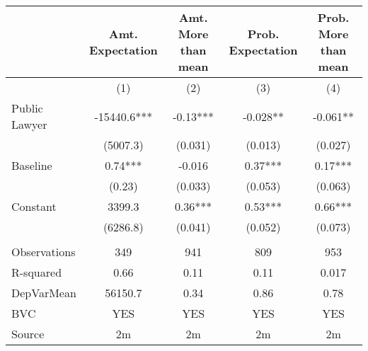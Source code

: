 \begin{tabular}{lcccc}
\toprule
      & Amt. Expectation & Amt. More than mean & Prob. Expectation & Prob. More than mean \\
\midrule
\midrule
      & (1)   & (2)   & (3)   & (4) \\
\midrule
\midrule
Public Lawyer & -15440.6*** & -0.13*** & -0.028** & -0.061** \\
      & (5007.3) & (0.031) & (0.013) & (0.027) \\
Baseline    & 0.74*** & -0.016 & 0.37*** & 0.17*** \\
      & (0.23) & (0.033) & (0.053) & (0.063) \\
Constant & 3399.3 & 0.36*** & 0.53*** & 0.66*** \\
      & (6286.8) & (0.041) & (0.052) & (0.073) \\
      &       &       &       &  \\
\midrule
Observations & 349   & 941   & 809   & 953 \\
R-squared & 0.66  & 0.11  & 0.11  & 0.017 \\
DepVarMean & 56150.7 & 0.34  & 0.86  & 0.78 \\
BVC   & YES   & YES   & YES   & YES \\
Source & 2m    & 2m    & 2m    & 2m \\
\bottomrule
\bottomrule
\end{tabular}%
